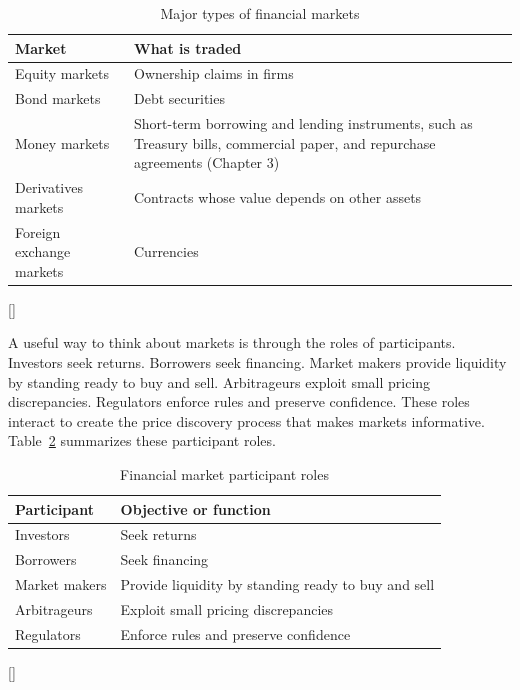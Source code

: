 \documentclass[../ai_in_finance]{subfiles}
\begin{document}
\begin{table}[htbp]
\centering
\begin{lrbox}{\bookmeasuredbox}
\begin{tabular}{p{4.0cm}p{8.0cm}}
\toprule
Market & What is traded \\
\midrule
Equity markets & Ownership claims in firms \\
Bond markets & Debt securities \\
Money markets & Short-term borrowing and lending instruments, such as Treasury bills, commercial paper, and repurchase agreements (Chapter 3) \\
Derivatives markets & Contracts whose value depends on other assets \\
Foreign exchange markets & Currencies \\
\bottomrule
\end{tabular}
\end{lrbox}
\ifdim\wd\bookmeasuredbox<0.65\linewidth
\setlength{\bookcapwidth}{0.65\linewidth}
\else
\setlength{\bookcapwidth}{\wd\bookmeasuredbox}
\fi
{}[\bookcapwidth]{
\usebox{\bookmeasuredbox}
}{
\caption{Major types of financial markets}
\label{tab:market_types}
}
\end{table}

A useful way to think about markets is through the roles of participants. Investors seek returns. Borrowers seek financing. Market makers provide liquidity by standing ready to buy and sell. Arbitrageurs exploit small pricing discrepancies. Regulators enforce rules and preserve confidence. These roles interact to create the price discovery process that makes markets informative. Table~\ref{tab:market_participant_roles} summarizes these participant roles.

\begin{table}[htbp]
\centering
\begin{lrbox}{\bookmeasuredbox}
\begin{tabular}{p{4.0cm}p{8.0cm}}
\toprule
Participant & Objective or function \\
\midrule
Investors & Seek returns \\
Borrowers & Seek financing \\
Market makers & Provide liquidity by standing ready to buy and sell \\
Arbitrageurs & Exploit small pricing discrepancies \\
Regulators & Enforce rules and preserve confidence \\
\bottomrule
\end{tabular}
\end{lrbox}
\ifdim\wd\bookmeasuredbox<0.65\linewidth
\setlength{\bookcapwidth}{0.65\linewidth}
\else
\setlength{\bookcapwidth}{\wd\bookmeasuredbox}
\fi
{}[\bookcapwidth]{
\usebox{\bookmeasuredbox}
}{
\caption{Financial market participant roles}
\label{tab:market_participant_roles}
}
\end{table}
\end{document}
